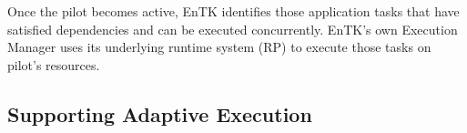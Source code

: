 Once the pilot becomes active, EnTK identifies those application tasks that
have satisfied dependencies and can be executed concurrently. EnTK's own
Execution Manager uses its underlying runtime system (RP) to execute those
tasks on pilot's resources.





\subsection{Supporting Adaptive Execution}\label{ssec:adaptive_execution}




